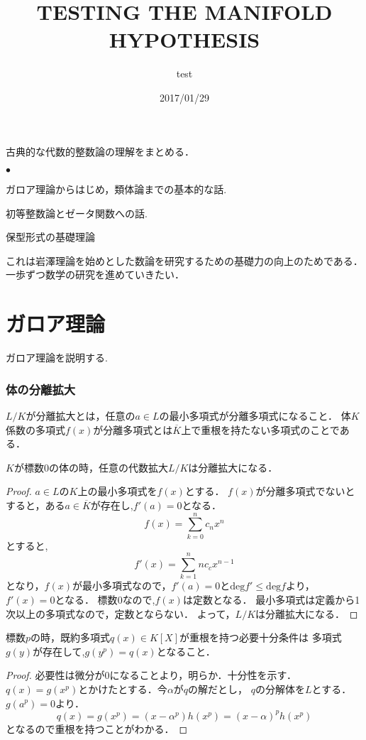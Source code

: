 \documentclass{ujarticle}
\title{TESTING THE MANIFOLD HYPOTHESIS}
\author{test}
\date{2017/01/29}
\renewenvironment{itemize}%
{%
   \begin{list}{\parbox{1zw}{$\bullet$}}%
   {%
      \setlength{\topsep}{0zh}
      \setlength{\itemindent}{0zw}
      \setlength{\leftmargin}{2zw}%
      \setlength{\rightmargin}{0zw}%
      \setlength{\labelsep}{1zw}%
      \setlength{\labelwidth}{3zw}%
      \setlength{\itemsep}{0em}%
      \setlength{\parsep}{0em}%
      \setlength{\listparindent}{0zw}%
   }
}{%
   \end{list}%
}
\begin{document}
古典的な代数的整数論の理解をまとめる．
  \begin{itemize}
    \item ガロア理論からはじめ，類体論までの基本的な話.
    \item 初等整数論とゼータ関数への話.
    \item 保型形式の基礎理論
  \end{itemize}
これは岩澤理論を始めとした数論を研究するための基礎力の向上のためである．
一歩ずつ数学の研究を進めていきたい．

\section{ガロア理論}
\label{sec:ガロア理論}
ガロア理論を説明する.

\subsubsection{体の分離拡大}
\label{sub:体の分離拡大}
\begin{dfn}
 $L/K$が分離拡大とは，任意の$a \in L$の最小多項式が分離多項式になること．
 体$K$係数の多項式$f(x)$が分離多項式とは$\overline{K}$上で重根を持たない多項式のことである．
\end{dfn}

\begin{prop}
 $K$が標数$0$の体の時，任意の代数拡大$L/K$は分離拡大になる．
\end{prop}
\begin{proof}
  $a \in L$の$K$上の最小多項式を$f(x)$とする．
  $f(x)$が分離多項式でないとすると，ある$a \in \overline{K}$が存在し,$f'(a)=0$となる．
  \begin{equation*}
   f(x)=\sum_{k=0}^n c_nx^n
  \end{equation*}
  とすると,
  \begin{equation*}
   f'(x)=\sum_{k=1}^n nc_cx^{n-1}
  \end{equation*}
  となり，$f(x)$が最小多項式なので，$f'(a)=0$と$\mathrm{deg}f' \le \mathrm{deg}f$より，$f'(x)=0$となる．
  標数$0$なので,$f(x)$は定数となる．
  最小多項式は定義から1次以上の多項式なので，定数とならない．
  よって，$L/K$は分離拡大になる．
\end{proof}

\begin{prop}
  標数$p$の時，既約多項式$q(x) \in K[X]$が重根を持つ必要十分条件は
  多項式$g(y)$が存在して,$g(y^p)=q(x)$となること．
\end{prop}
\begin{proof}
  必要性は微分が$0$になることより，明らか．十分性を示す．
  $q(x)=g(x^p)$とかけたとする．今$ \alpha$が$q$の解だとし，
  $q$の分解体を$L$とする．$g(a^p)=0$より．
  \begin{equation*}
   q(x)=g(x^p)=(x-\alpha^p)h(x^p)=(x-\alpha)^ph(x^p)
  \end{equation*}
  となるので重根を持つことがわかる．
\end{proof}
\end{document}

